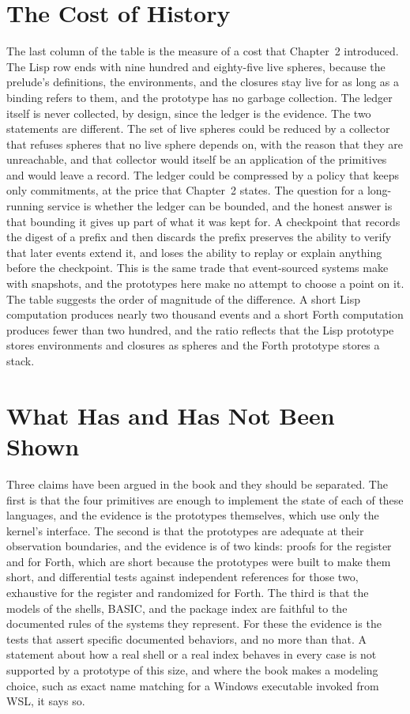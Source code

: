 \documentclass[11pt,oneside]{report}
\theoremstyle{plain}
\theoremstyle{definition}
\theoremstyle{remark}
\begin{document}
\section{The Cost of History}

The last column of the table is the measure of a cost that Chapter~2 introduced. The Lisp row ends with nine hundred and eighty-five live spheres, because the prelude's definitions, the environments, and the closures stay live for as long as a binding refers to them, and the prototype has no garbage collection. The ledger itself is never collected, by design, since the ledger is the evidence. The two statements are different. The set of live spheres could be reduced by a collector that refuses spheres that no live sphere depends on, with the reason that they are unreachable, and that collector would itself be an application of the primitives and would leave a record. The ledger could be compressed by a policy that keeps only commitments, at the price that Chapter~2 states. The question for a long-running service is whether the ledger can be bounded, and the honest answer is that bounding it gives up part of what it was kept for. A checkpoint that records the digest of a prefix and then discards the prefix preserves the ability to verify that later events extend it, and loses the ability to replay or explain anything before the checkpoint. This is the same trade that event-sourced systems make with snapshots, and the prototypes here make no attempt to choose a point on it. The table suggests the order of magnitude of the difference. A short Lisp computation produces nearly two thousand events and a short Forth computation produces fewer than two hundred, and the ratio reflects that the Lisp prototype stores environments and closures as spheres and the Forth prototype stores a stack.

\section{What Has and Has Not Been Shown}

Three claims have been argued in the book and they should be separated. The first is that the four primitives are enough to implement the state of each of these languages, and the evidence is the prototypes themselves, which use only the kernel's interface. The second is that the prototypes are adequate at their observation boundaries, and the evidence is of two kinds: proofs for the register and for Forth, which are short because the prototypes were built to make them short, and differential tests against independent references for those two, exhaustive for the register and randomized for Forth. The third is that the models of the shells, BASIC, and the package index are faithful to the documented rules of the systems they represent. For these the evidence is the tests that assert specific documented behaviors, and no more than that. A statement about how a real shell or a real index behaves in every case is not supported by a prototype of this size, and where the book makes a modeling choice, such as exact name matching for a Windows executable invoked from WSL, it says so.
\end{document}
